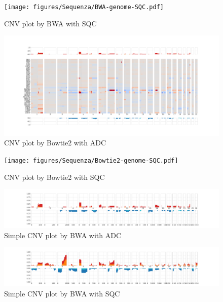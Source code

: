 \documentclass[a4paper]{article}
\begin{document}
            \begin{figure}[htbp]
                \centering
                \texttt{[image: figures/Sequenza/BWA-genome-SQC.pdf]}
                \caption{CNV plot by BWA with SQC}
                \label{fig:CNV-BWA-SQC}
            \end{figure}

            \begin{figure}[htbp]
                \centering
                \includegraphics[width=\linewidth]{figures/Sequenza/Bowtie2-genome-ADC.pdf}
                \caption{CNV plot by Bowtie2 with ADC}
                \label{fig:CNV-Bowtie2-ADC}
            \end{figure}

            \begin{figure}[htbp]
                \centering
                \texttt{[image: figures/Sequenza/Bowtie2-genome-SQC.pdf]}
                \caption{CNV plot by Bowtie2 with SQC}
                \label{fig:CNV-Bowtie2-SQC}
            \end{figure}

            \begin{figure}[htbp]
                \centering
                \includegraphics[width=\linewidth]{figures/Sequenza/BWA-simple-ADC.pdf}
                \caption{Simple CNV plot by BWA with ADC}
                \label{fig:SimpleCNV-BWA-ADC}
            \end{figure}

            \begin{figure}[htbp]
                \centering
                \includegraphics[width=\linewidth]{figures/Sequenza/BWA-simple-SQC.pdf}
                \caption{Simple CNV plot by BWA with SQC}
                \label{fig:SimpleCNV-BWA-SQC}
            \end{figure}
\end{document}
